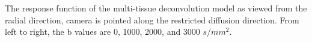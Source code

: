 \label{fig:responseXView} The response function of the multi-tissue deconvolution model as viewed from the radial direction, camera is pointed along the restricted diffusion direction. From left to right, the b values are 0, 1000, 2000, and 3000 $s/mm^2$.